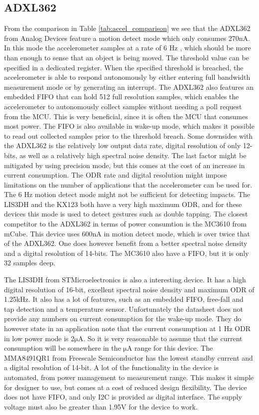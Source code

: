 \subsection{ADXL362}
From the comparison in Table \ref{tab:accel_comparison} we see that the ADXL362 from Analog Devices feature a motion detect mode which only consumes 270nA. In this mode the accelerometer samples at a rate of 6 Hz \cite{adxl362}, which should be more than enough to sense that an object is being moved. The threshold value can be specified in a dedicated register. When the specified threshold is breached, the accelerometer is able to respond autonomously by either entering full bandwidth measurement mode or by generating an interrupt. The ADXL362 also features an embedded FIFO that can hold 512 full resolution samples, which enables the accelerometer to autonomously collect samples without needing a poll request from the MCU. This is very beneficial, since it is often the MCU that consumes most power. The FIFO is also available in wake-up mode, which makes it possible to read out collected samples prior to the threshold breach. Some downsides with the ADXL362 is the relatively low output data rate, digital resolution of only 12-bits, as well as a relatively high spectral noise density. The last factor might be mitigated by using precision mode, but this comes at the cost of an increase in current consumption. The ODR rate and digital resolution might impose limitations on the number of applications that the accelerometer can be used for. The 6 Hz motion detect mode might not be sufficient for detecting impacts. The LIS3DH and the KX123 both have a very high maximum ODR, and for these devices this mode is used to detect gestures such as double tapping. The closest competitor to the ADXL362 in terms of power consumtion is the MC3610 from mCube. This device uses 600nA in motion detect mode, which is over twice that of the ADXL362. One does however benefit from a better spectral noise density and a digital resolution of 14-bits. The MC3610 also have a FIFO, but it is only 32 samples deep. 

The LIS3DH from STMicroelectronics is also a interesting device. It has a high digital resolution of 16-bit, excellent spectral noise density and maximum ODR of 1.25kHz. It also has a lot of features, such as an embedded FIFO, free-fall and tap detection and a temperature sensor. Unfortunately the datasheet does not provide any numbers on current consumption for the wake-up mode. They do however state in an application note \cite{lis3dh_appnote} that the current consumption at 1 Hz ODR in low power mode is 2$\si{\micro\ampere}$. So it is very reasonable to assume that the current consumption will be somewhere in the $\si{\micro\ampere}$ range for this device. The MMA8491QR1 from Freescale Semiconductor has the lowest standby current and a digital resolution of 14-bit. A lot of the functionality in the device is automated, from power management to measurement range. This makes it simple for designer to use, but comes at a cost of reduced design flexibility. The device does not have FIFO, and only I2C is provided as digital interface. The supply voltage must also be greater than 1.95V for the device to work. 

